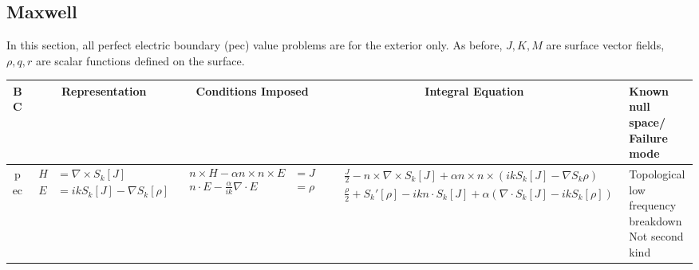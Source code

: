\documentclass{article}
\begin{document}
\subsection{Maxwell}
In this section, all perfect electric boundary (pec) value problems are for the exterior only. As before, $J, K, M$ are surface vector fields, $\rho, q, r$ are scalar functions defined on the surface.
\footnotesize
\begin{center}
\begin{tabular}{||c c c c p{4.5cm}||} 
 \hline
 BC &  Representation  & Conditions Imposed & Integral Equation & Known null space/ Failure mode \\ [0.5ex] 
 \hline\hline
pec & $\begin{aligned} H &= \nabla \times S_{k}[J] \\ E &= ik S_{k} [J] - \nabla S_{k}[\rho] \end{aligned}$ & $\begin{aligned} n \times H - \alpha n \times n \times E &= J \\ n \cdot E - \frac{\alpha}{ik} \nabla \cdot E &= \rho \end{aligned}$ & $\begin{aligned} &\frac{J}{2} - n \times \nabla \times S_{k}[J] + \alpha n \times n\times (ik S_{k}[J] - \nabla S_{k} \rho) \\ 
&\frac{\rho}{2} + S_{k}'[\rho] - ik n\cdot S_{k}[J] + \alpha (\nabla \cdot S_{k}[J] - ik S_{k}[\rho]) \end{aligned}$  & Topological low frequency breakdown \newline Not second kind \\[1 ex]
 \hline
\end{tabular}
\end{center}
\end{document}

